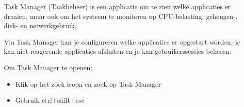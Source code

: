 Task Manager (Taakbeheer) is een applicatie om te zien welke applicaties er draaien, maar ook om het systeem te monitoren op CPU-belasting, geheugen-, disk- en netwerkgebruik.

Via Task Manager kan je configureren welke applicaties er opgestart worden, je kan niet reagerende applicaties afsluiten en je kan gebruikerssessies beheren.

Om Task Manager te openen:
\begin{itemize}
\item Klik op het zoek icoon en zoek op Task Manager
\item Gebruik ctrl+shift+esc
\end{itemize}

\begin{minipage}[t]{\linewidth}
\raggedright
{}
\end{minipage}

